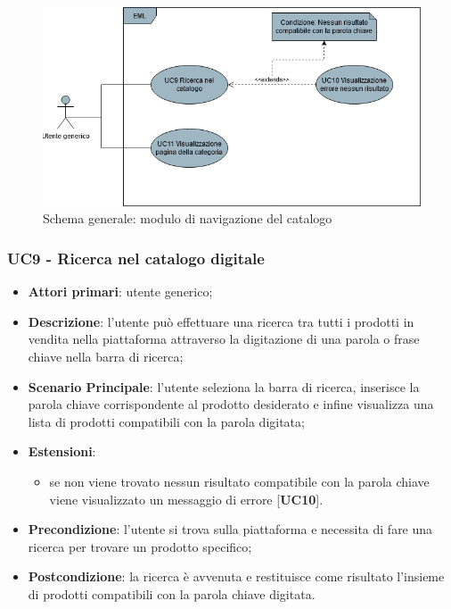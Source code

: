 \begin{figure}[H]
\centering
\includegraphics[scale=0.6]{res/UseCase/Immagini/NavigazioneCatalogoGenerale}
\caption{Schema generale: modulo di navigazione del catalogo}
\end{figure}
\subsubsection{UC9 - Ricerca nel catalogo digitale}
\begin{itemize}
\item \textbf{Attori primari}: utente generico;
\item \textbf{Descrizione}: l'utente può effettuare una ricerca tra tutti i prodotti in vendita nella piattaforma attraverso la digitazione di una parola o frase chiave nella barra di ricerca;
\item \textbf{Scenario Principale}: l'utente seleziona la barra di ricerca, inserisce la parola chiave corrispondente al prodotto desiderato e infine visualizza una lista di prodotti compatibili con la parola digitata;
\item \textbf{Estensioni}:
\begin{itemize}
\item se non viene trovato nessun risultato compatibile con la parola chiave viene visualizzato un messaggio di errore [\textbf{UC10}].
\end{itemize}
\item \textbf{Precondizione}: l'utente si trova sulla piattaforma e necessita di fare una ricerca per trovare un prodotto specifico;
\item \textbf{Postcondizione}: la ricerca è avvenuta e restituisce come risultato l'insieme di prodotti compatibili con la parola chiave digitata.
\end{itemize}

